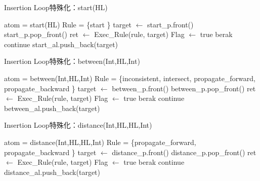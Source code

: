 \begin{algorithm}
    \caption{Insertion Loop特殊化：start(HL)}
\begin{algorithmic}
    \scriptsize
    \Require atom = start(HL)
    \Require Rule = \{start \}
            \State target $\gets$  start\_p.front()
            \State start\_p.pop\_front()
             
                \State ret $\gets$ Exec\_Rule(rule, target)
                 
                    \State Flag $\gets$ true
                    \State berak
                \EndIf
            \EndFor
                \State continue
            \EndIf
            \State start\_al.push\_back(target)
        \EndWhile
    \EndProcedure
\end{algorithmic}
\end{algorithm}

\begin{algorithm}
    \caption{Insertion Loop特殊化：between(Int,HL,Int)}
\begin{algorithmic}
    \scriptsize
    \Require atom = between(Int,HL,Int)
    \Require Rule = \{inconsistent, intersect, propagate\_forward, propagate\_backward \}
            \State target $\gets$  between\_p.front()
            \State between\_p.pop\_front()
                \State ret $\gets$ Exec\_Rule(rule, target)
                 
                    \State Flag $\gets$ true
                    \State berak
                \EndIf
            \EndFor
                \State continue
            \EndIf
            \State between\_al.push\_back(target)
        \EndWhile
    \EndProcedure
\end{algorithmic}
\end{algorithm}

\begin{algorithm}
    \caption{Insertion Loop特殊化：distance(Int,HL,HL,Int)}
\begin{algorithmic}
    \scriptsize
    \Require atom = distance(Int,HL,HL,Int)
    \Require Rule = \{propagate\_forward, propagate\_backward \}
            \State target $\gets$  distance\_p.front()
            \State distance\_p.pop\_front()
                \State ret $\gets$ Exec\_Rule(rule, target)
                 
                    \State Flag $\gets$ true
                    \State berak
                \EndIf
            \EndFor
                \State continue
            \EndIf
            \State distance\_al.push\_back(target)
        \EndWhile
    \EndProcedure
\end{algorithmic}
\end{algorithm}

